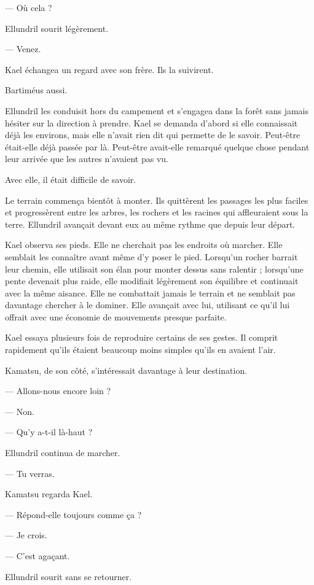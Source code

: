 — Où cela ?

Ellundril sourit légèrement.

— Venez.

Kael échangea un regard avec son frère. Ils la suivirent.

Bartiméus aussi.

\scenebreak

Ellundril les conduisit hors du campement et s'engagea dans la forêt sans
jamais hésiter sur la direction à prendre. Kael se demanda d'abord si elle
connaissait déjà les environs, mais elle n'avait rien dit qui permette de le
savoir. Peut-être était-elle déjà passée par là. Peut-être avait-elle remarqué
quelque chose pendant leur arrivée que les autres n'avaient pas vu.

Avec elle, il était difficile de savoir.

Le terrain commença bientôt à monter. Ils quittèrent les passages les plus
faciles et progressèrent entre les arbres, les rochers et les racines qui
affleuraient sous la terre. Ellundril avançait devant eux au même rythme que
depuis leur départ.

Kael observa ses pieds. Elle ne cherchait pas les endroits où marcher. Elle
semblait les connaître avant même d'y poser le pied. Lorsqu'un rocher barrait
leur chemin, elle utilisait son élan pour monter dessus sans ralentir ;
lorsqu'une pente devenait plus raide, elle modifiait légèrement son équilibre
et continuait avec la même aisance. Elle ne combattait jamais le terrain et ne
semblait pas davantage chercher à le dominer. Elle avançait avec lui, utilisant
ce qu'il lui offrait avec une économie de mouvements presque parfaite.

Kael essaya plusieurs fois de reproduire certains de ses gestes. Il comprit
rapidement qu'ils étaient beaucoup moins simples qu'ils en avaient l'air.

Kamatsu, de son côté, s'intéressait davantage à leur destination.

— Allons-nous encore loin ?

— Non.

— Qu'y a-t-il là-haut ?

Ellundril continua de marcher.

— Tu verras.

Kamatsu regarda Kael.

— Répond-elle toujours comme ça ?

— Je crois.

— C'est agaçant.

Ellundril sourit sans se retourner.

